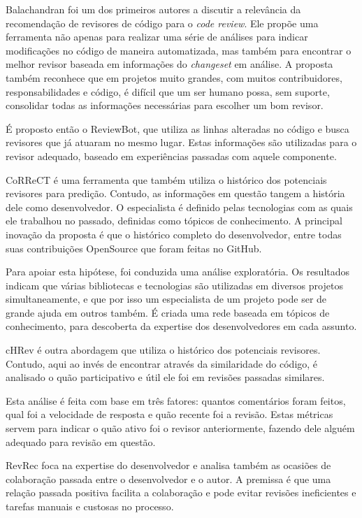 \documentclass[a4paper,12pt]{monografia}
\theoremstyle{plain}
\theoremstyle{definition}
\theoremstyle{remark}
\begin{document}
Balachandran \cite{balachandran2013} foi um dos primeiros autores a discutir a relevância da recomendação de revisores de código para o \textit{code review}. Ele propõe uma ferramenta não apenas para realizar uma série de análises para indicar modificações no código de maneira automatizada, mas também para encontrar o melhor revisor baseada em informações do \textit{changeset} em análise. A proposta também reconhece que em projetos muito grandes,  com muitos contribuidores, responsabilidades e código, é difícil que um ser humano possa, sem suporte, consolidar todas as informações necessárias para escolher um bom revisor.

É proposto então o ReviewBot, que utiliza as linhas alteradas no código e busca revisores que já atuaram no mesmo lugar. Estas informações são utilizadas para o revisor adequado, baseado em experiências passadas com aquele componente.

CoRReCT \cite{rahman2016} é uma ferramenta que também utiliza o histórico dos potenciais revisores para predição. Contudo, as informações em questão tangem a história dele como desenvolvedor. O especialista é definido pelas tecnologias com as quais ele trabalhou no passado, definidas como tópicos de conhecimento. A principal inovação da proposta é que o histórico completo do desenvolvedor, entre todas suas contribuições OpenSource que foram feitas no GitHub.

Para apoiar esta hipótese, foi conduzida uma análise exploratória. Os resultados indicam que várias bibliotecas e tecnologias são utilizadas em diversos projetos simultaneamente, e que por isso um especialista de um projeto pode ser de grande ajuda em outros também. É criada uma rede baseada em tópicos de conhecimento, para descoberta da expertise dos desenvolvedores em cada assunto.


cHRev \cite{zanjani2016} é outra abordagem que utiliza o histórico dos potenciais revisores. Contudo, aqui ao invés de encontrar através da similaridade do código, é analisado o quão participativo e útil ele foi em revisões passadas similares.

Esta análise é feita com base em três fatores: quantos comentários foram feitos, qual foi a velocidade de resposta e quão recente foi a revisão. Estas métricas servem para indicar o quão ativo foi o revisor anteriormente, fazendo dele alguém adequado para revisão em questão.

RevRec \cite{ouni2016} foca na expertise do desenvolvedor e analisa também as ocasiões de colaboração passada entre o desenvolvedor e o autor. A premissa é que uma relação passada positiva facilita a colaboração e pode evitar revisões ineficientes e tarefas manuais e custosas no processo.
\end{document}
